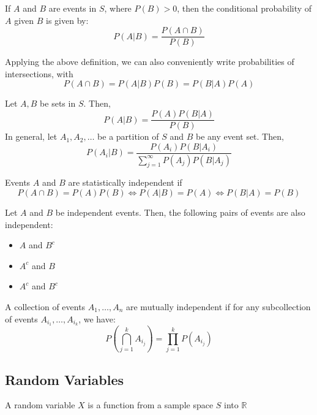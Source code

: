 \begin{definition}
    If $A$ and $B$ are events in $S$, where $P(B) > 0$, then the conditional probability of $A$ given $B$ is given by:
    \[
    P(A \vert B) = \frac{P(A \cap B)}{P(B)}
    \]
\end{definition}

Applying the above definition, we can also conveniently write probabilities of intersections, with
\[
P(A \cap B) = P(A \vert B)P(B) = P(B \vert A)P(A)
\]

\begin{theorem}
    Let $A, B$ be sets in $S$. Then,
    \[
    P(A \vert B) = \frac{P(A)P(B \vert A)}{P(B)}
    \]
    In general, let $A_1, A_2, \dots$ be a partition of $S$ and $B$ be any event set. Then,
    \[
    P(A_i \vert B) = \frac{P(A_i)P(B \vert A_i)}{\sum_{j=1}^{\infty}{P(A_j)P(B \vert A_j)}}
    \]
\end{theorem}

\begin{definition}
    Events $A$ and $B$ are statistically independent if
    \[
    P(A \cap B) = P(A)P(B) \iff P(A \vert B) = P(A) \iff P(B \vert A) = P(B) 
    \]
\end{definition}

\begin{theorem}
    Let $A$ and $B$ be independent events. Then, the following pairs of events are also independent:
    \begin{itemize}
        \item $A$ and $B^c$
        \item $A^c$ and $B$
        \item $A^c$ and $B^c$
    \end{itemize}
\end{theorem}

\begin{definition}
    A collection of events $A_1, \dots, A_n$ are mutually independent if for any subcollection of events $A_{i_1}, \dots, A_{i_k}$, we have:
    \[
    P\left(\bigcap_{j=1}^{k}{A_{i_j}}\right) = \prod_{j=1}^{k}{P(A_{i_j})}
    \]
\end{definition}
\bigskip


\subsection*{Random Variables}
\begin{definition}
    A random variable $X$ is a function from a sample space $S$ into $\mathbb{R}$
\end{definition}

